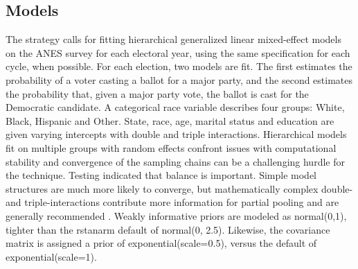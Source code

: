 \begin{itemize}



\end{itemize}


\subsection{Models}

The strategy calls for fitting hierarchical generalized linear mixed-effect models on the ANES survey for each electoral year, using the same specification for each cycle, when possible. For each election, two models are fit. The first estimates the probability of a voter casting a ballot for a major party, and the second estimates the probability that, given a major party vote, the ballot is cast for the Democratic candidate. A categorical race variable describes four groups: White, Black, Hispanic and Other. State, race, age, marital status and education are given varying intercepts with double and triple interactions. Hierarchical models fit on multiple groups with random effects confront issues with computational stability and convergence of the sampling chains can be a challenging hurdle for the technique. Testing indicated that balance is important. Simple model structures are much more likely to converge, but mathematically complex double- and triple-interactions contribute more information for partial pooling and are generally recommended \citep{ghitza_deep_2013}. Weakly informative priors are modeled as normal(0,1), tighter than the rstanarm default of normal(0, 2.5). Likewise, the covariance matrix is assigned a prior of exponential(scale=0.5), versus the default of exponential(scale=1). 

